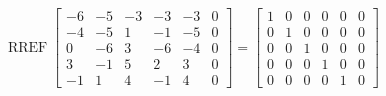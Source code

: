 \begin{exerciseAnswer} 


\[\operatorname{RREF} \left[\begin{array}{ccccc|c}
-6 & -5 & -3 & -3 & -3 & 0 \\
-4 & -5 & 1 & -1 & -5 & 0 \\
0 & -6 & 3 & -6 & -4 & 0 \\
3 & -1 & 5 & 2 & 3 & 0 \\
-1 & 1 & 4 & -1 & 4 & 0
\end{array}\right] = \left[\begin{array}{ccccc|c}
1 & 0 & 0 & 0 & 0 & 0 \\
0 & 1 & 0 & 0 & 0 & 0 \\
0 & 0 & 1 & 0 & 0 & 0 \\
0 & 0 & 0 & 1 & 0 & 0 \\
0 & 0 & 0 & 0 & 1 & 0
\end{array}\right] \]



\end{exerciseAnswer}
